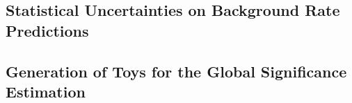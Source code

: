 \subsection{Statistical Uncertainties on Background Rate Predictions}%
\label{app:barlow_beeston}



\clearpage
\subsection{Generation of Toys for the Global Significance Estimation}%
\label{app:toy_generation}






%   


